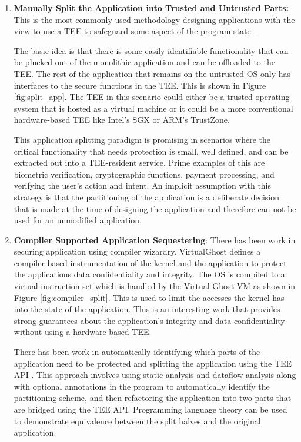\begin{enumerate}
    \item \textbf{Manually Split the Application into Trusted and Untrusted
    Parts:} This is the most commonly used methodology designing applications
    with the view to use a TEE to safeguard some aspect of the program state 
    \cite{TLR,Proxos,SchrodinText,liu2014veriui}. 
    
    The basic idea is that there is some easily identifiable functionality that
    can be plucked out of the monolithic application and can be offloaded to the
    TEE. The rest of the application that remains on the untrusted OS only has interfaces to the secure functions in the TEE. This is shown in Figure
    \ref{fig:split_app}. The TEE in this scenario could either be a trusted operating system that is hosted as a virtual machine or it could be a
    more conventional hardware-based TEE like Intel's SGX or ARM's TrustZone. 

    This application splitting paradigm is promising in scenarios where the critical functionality that needs protection is small, well defined, and can be extracted out into a TEE-resident service. Prime examples of this are biometric verification, cryptographic functions, payment processing, and verifying the user's action and intent. An implicit assumption with this strategy is that the partitioning of the application is a deliberate decision that is made at the time of designing the application and therefore can not be used for an unmodified application. 
    
    \item \textbf{Compiler Supported Application Sequestering}: There has been work in securing application using compiler wizardry. VirtualGhost
    \cite{criswell2014virtual} defines a compiler-based instrumentation of the
    kernel and the application to protect the applications data confidentiality
    and integrity. The OS is compiled to a virtual instruction set which is
    handled by the Virtual Ghost VM as shown in Figure \ref{fig:compiler_split}.
    This  is used to limit the accesses the kernel has into the state of the application. This is an interesting work that provides strong guarantees about the application's integrity and data confidentiality without using a hardware-based TEE. 
    
    There has been work in automatically identifying which parts of the application need to be protected and splitting the application using the TEE API \cite{rubinov2016automated, lind2017glamdring}. This approach involves using static analysis and dataflow analysis along with optional annotations in the program to automatically identify the partitioning scheme, and then refactoring the application into two parts that are bridged using the TEE API. Programming language theory can be used to demonstrate equivalence between the split halves and the original application. 


\end{enumerate}
